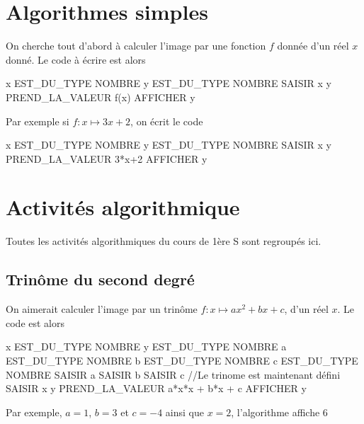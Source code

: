 \section{Algorithmes simples}
On cherche tout d'abord à calculer l'image par une fonction $f$ donnée d'un réel $x$ donné. Le code à écrire est alors 
\begin{algobox}
\Variables
\Ligne x EST\_DU\_TYPE NOMBRE
\Ligne y EST\_DU\_TYPE NOMBRE
\DebutAlgo
\Ligne SAISIR x
\Ligne y PREND\_LA\_VALEUR f(x)
\Ligne AFFICHER y
\FinAlgo
\end{algobox}
Par exemple si $f:x\mapsto3x+2$, on écrit le code
\begin{algobox}
\Variables
\Ligne x EST\_DU\_TYPE NOMBRE
\Ligne y EST\_DU\_TYPE NOMBRE
\DebutAlgo
\Ligne SAISIR x
\Ligne y PREND\_LA\_VALEUR 3*x+2
\Ligne AFFICHER y
\FinAlgo
\end{algobox}
\section{Activités algorithmique}
Toutes les activités algorithmiques du cours de 1ère S sont regroupés ici.
\subsection{Trinôme du second degré}
On aimerait calculer l'image par un trinôme $f:x\mapsto ax^2+bx+c$, d'un réel $x$. Le code est alors
\begin{algobox}
\Variables
\Ligne x EST\_DU\_TYPE NOMBRE
\Ligne y EST\_DU\_TYPE NOMBRE
\Ligne a EST\_DU\_TYPE NOMBRE
\Ligne b EST\_DU\_TYPE NOMBRE
\Ligne c EST\_DU\_TYPE NOMBRE
\DebutAlgo
\Ligne SAISIR a
\Ligne SAISIR b
\Ligne SAISIR c
\Ligne //Le trinome est maintenant défini
\Ligne SAISIR x
\Ligne y PREND\_LA\_VALEUR a*x*x + b*x + c
\Ligne AFFICHER y
\FinAlgo
\end{algobox}
Par exemple, $a=1$, $b=3$ et $c=-4$ ainsi que $x=2$, l'algorithme affiche $6$\newline

